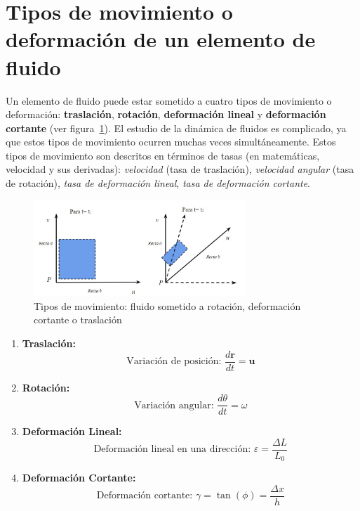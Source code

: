 \documentclass[10pt, oneside]{article}
\begin{document}
\section{Tipos de movimiento o deformación de un elemento de fluido}

Un elemento de fluido puede estar sometido a cuatro tipos de movimiento o deformación: \textbf{traslación}, \textbf{rotación}, \textbf{deformación lineal} y \textbf{deformación cortante} (ver figura~\ref{tmove}). El estudio de la dinámica de fluidos es complicado, ya que estos tipos de movimiento ocurren muchas veces simultáneamente. Estos tipos de movimiento son descritos en términos de tasas (en matemáticas, velocidad y sus derivadas): \emph{velocidad} (tasa de traslación), \emph{velocidad angular} (tasa de rotación), \emph{tasa de deformación lineal}, \emph{tasa de deformación cortante}.

\begin{figure}[h]
\centering
\includegraphics[width=8cm]{Fig.10.jpg}
\caption{Tipos de movimiento: fluido sometido a rotación, deformación cortante o traslación}
\label{tmove}
\end{figure}

\begin{enumerate}
    \item \textbf{Traslación:}
        \begin{equation}
            \text{Variación de posición: } \frac{d\mathbf{r}}{dt} = \mathbf{u}
        \end{equation}

    \item \textbf{Rotación:}
        \begin{equation}
            \text{Variación angular: } \frac{d\theta}{dt} = \omega
        \end{equation}

    \item \textbf{Deformación Lineal:}
        \begin{equation}
            \text{Deformación lineal en una dirección: } \varepsilon = \frac{\Delta L}{L_0}
        \end{equation}

    \item \textbf{Deformación Cortante:}
        \begin{equation}
            \text{Deformación cortante: } \gamma = \tan(\phi) = \frac{\Delta x}{h}
        \end{equation}
\end{enumerate}
\end{document}
